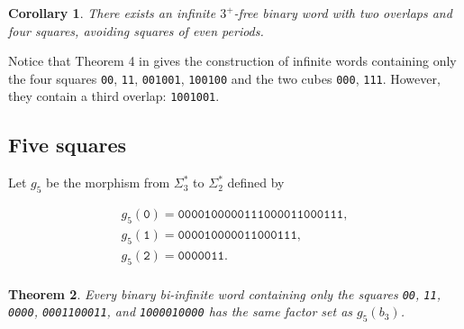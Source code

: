 \documentclass{article}
\theoremstyle{plain}
\newtheorem{theorem}{Theorem}
\newtheorem{corollary}[theorem]{Corollary}
\theoremstyle{definition}
\theoremstyle{remark}
\begin{document}
\begin{corollary}
There exists an infinite $3^+$-free binary word with two overlaps and four squares, avoiding squares of even periods.
\end{corollary}

Notice that Theorem 4 in \cite{BC-IPL} gives the construction of infinite words containing
only the four squares \texttt{00}, \texttt{11}, \texttt{001001}, \texttt{100100} and the two cubes
\texttt{000}, \texttt{111}. However, they contain a third overlap: \texttt{1001001}.

% 

\subsection{Five squares}\label{ssec:5sq}
Let $g_5$ be the morphism from $\Sigma_3^*$ to $\Sigma_2^*$ defined by

$$\begin{array}{l}
 g_5(\texttt{0})=\texttt{0000100000111000011000111},\\
 g_5(\texttt{1})=\texttt{000010000011000111},\\
 g_5(\texttt{2})=\texttt{0000011}.\\
\end{array}$$

\begin{theorem}
Every binary bi-infinite word containing only the squares \textnormal{\texttt{00}}, \textnormal{\texttt{11}}, \textnormal{\texttt{0000}}, \textnormal{\texttt{0001100011}}, and \textnormal{\texttt{1000010000}}
has the same factor set as $g_5(b_3)$.
\end{theorem}
\end{document}
